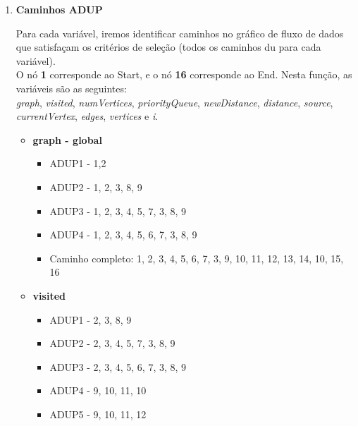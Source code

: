 \documentclass{article}
\begin{document}
\begin{itemize}
\begin{enumerate}
    \item \textbf{Caminhos ADUP}\\
    \texttt{}\par Para cada variável, iremos identificar caminhos no gráfico de fluxo de dados que satisfaçam os critérios de seleção (todos os caminhos du
para cada variável).\\
    O nó \textbf{1} corresponde ao Start, e o nó \textbf{16} corresponde ao End.
    Nesta função, as variáveis são as seguintes:\\
    \textit{graph}, \textit{visited}, \textit{numVertices}, \textit{priorityQueue}, \textit{newDistance}, \textit{distance}, \textit{source}, \textit{currentVertex}, \textit{edges}, \textit{vertices} e \textit{i}.
    \begin{itemize}
        \item \textbf{graph - global}
        \begin{itemize}
            \item ADUP1 - 1,2
            \item ADUP2 - 1, 2, 3, 8, 9
            \item ADUP3 - 1, 2, 3, 4, 5, 7, 3, 8, 9
            \item ADUP4 - 1, 2, 3, 4, 5, 6, 7, 3, 8, 9
            \item Caminho completo: 1, 2, 3, 4, 5, 6, 7, 3, 9, 10, 11, 12, 13, 14, 10, 15, 16
        \end{itemize}
        \item \textbf{visited}
        \begin{itemize}
            \item ADUP1 - 2, 3, 8, 9
            \item ADUP2 - 2, 3, 4, 5, 7, 3, 8, 9
            \item ADUP3 - 2, 3, 4, 5, 6, 7, 3, 8, 9
            \item ADUP4 - 9, 10, 11, 10
            \item ADUP5 - 9, 10, 11, 12
    

\end{itemize}
\end{itemize}
\end{enumerate}
\end{itemize}
\end{document}
